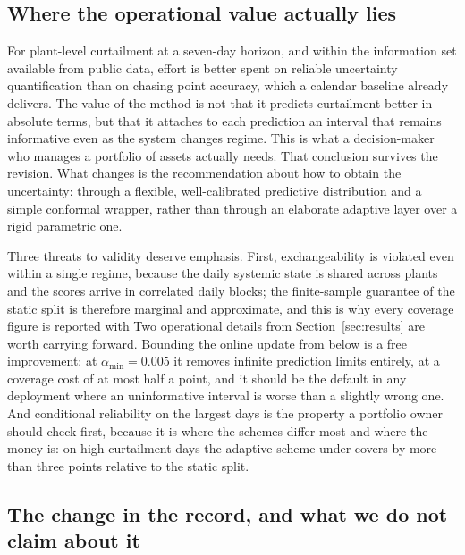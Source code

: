 \documentclass[preprint,3p,times]{elsarticle}
\providecommand{\DIFaddtex}[1]{{\protect\color{blue} \sf #1}} %
\providecommand{\DIFdeltex}[1]{{\protect\color{red} \scriptsize #1}} %
\providecommand{\DIFaddbegin}{} %
\providecommand{\DIFaddend}{} %
\providecommand{\DIFdelbegin}{} %
\providecommand{\DIFdelend}{} %
\providecommand{\DIFadd}[1]{\texorpdfstring{\DIFaddtex{#1}}{#1}} %
\providecommand{\DIFdel}[1]{\texorpdfstring{\DIFdeltex{#1}}{}} %
\begin{document}
\subsection{Where the operational value actually lies}

\DIFaddend For plant-level curtailment at a seven-day horizon, \DIFaddbegin \DIFadd{and within the information set available from public data, }\DIFaddend effort is better spent on reliable uncertainty quantification than on chasing point accuracy, which a calendar baseline already delivers. \DIFdelbegin \DIFdel{The value of the method is not that it predicts curtailment better in absolute terms, but that it attaches to each prediction an interval that remains informative even as the system changes regime. This is what a decision-maker who manages a portfolio of assets actually needs.
}\DIFdelend \DIFaddbegin \DIFadd{That conclusion survives the revision. What changes is the recommendation about how to obtain the uncertainty: through a flexible, well-calibrated predictive distribution and a simple conformal wrapper, rather than through an elaborate adaptive layer over a rigid parametric one.
}\DIFaddend 

\DIFdelbegin \DIFdel{Three threats to validity deserve emphasis.
First, exchangeability is violated even within a single regime, because the daily systemic state is shared across plants and the scores arrive in correlated daily blocks; the finite-sample guarantee of the static split is therefore marginal and approximate, and this is why every coverage figure is reported with }\DIFdelend \DIFaddbegin \DIFadd{Two operational details from Section~\ref{sec:results} are worth carrying forward. Bounding the online update from below is a free improvement: at $\alpha_{\min}=0.005$ it removes infinite prediction limits entirely, at a coverage cost of at most half a point, and it should be the default in any deployment where an uninformative interval is worse than a slightly wrong one. And conditional reliability on the largest days is the property a portfolio owner should check first, because it is where the schemes differ most and where the money is: on high-curtailment days the adaptive scheme under-covers by more than three points relative to the static split.
}

\subsection{The change in the record, and what we do not claim about it}
\end{document}
